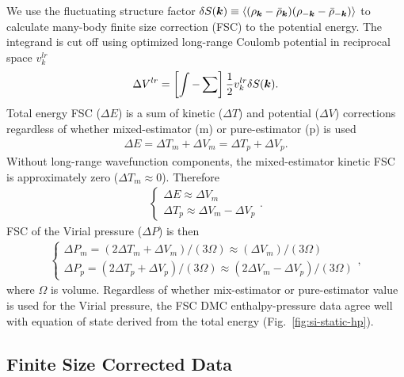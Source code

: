 We use the fluctuating structure factor $\delta S(\boldsymbol{k})\equiv \braket{(\rho_{\boldsymbol{k}}-\bar{\rho}_{\boldsymbol{k}})(\rho_{-\boldsymbol{k}}-\bar{\rho}_{-\boldsymbol{k}})}$ to calculate many-body finite size correction (FSC) to the potential energy. The integrand is cut off using optimized long-range Coulomb potential in reciprocal space $v_k^{lr}$
\begin{align}
\Delta V^{lr} = \left[\int - \sum\right] \frac{1}{2}v^{lr}_k \delta S(\boldsymbol{k}).
\end{align}
Total energy FSC ($\Delta E$) is a sum of kinetic ($\Delta T$) and potential ($\Delta V$) corrections regardless of whether mixed-estimator (m) or pure-estimator (p) is used
\begin{align}
\Delta E = \Delta T_m + \Delta V_m = \Delta T_p + \Delta V_p.
\end{align}
Without long-range wavefunction components, the mixed-estimator kinetic FSC is approximately zero ($\Delta T_m \approx 0$). Therefore
\begin{align}
\left\{\begin{array}{l}
\Delta E \approx \Delta V_m \\
\Delta T_p \approx \Delta V_m - \Delta V_p
\end{array}\right..
\end{align}
FSC of the Virial pressure ($\Delta P$) is then
\begin{align}
\left\{\begin{array}{l}
\Delta P_m = (2\Delta T_m + \Delta V_m)/(3\Omega) \approx (\Delta V_m)/(3\Omega) \\
\Delta P_p = (2\Delta T_p + \Delta V_p)/(3\Omega) \approx (2\Delta V_m-\Delta V_p)/(3\Omega)
\end{array}\right., \label{eq:pm-pp-fsc}
\end{align}
where $\Omega$ is volume. Regardless of whether mix-estimator or pure-estimator value is used for the Virial pressure, the FSC DMC enthalpy-pressure data agree well with equation of state derived from the total energy (Fig.~\ref{fig:si-static-hp}).

\subsection{Finite Size Corrected Data}

